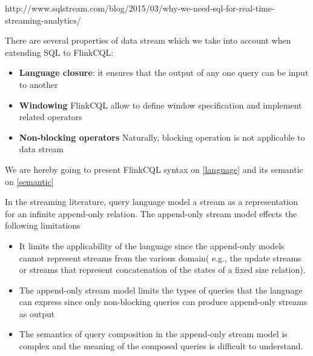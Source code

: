 http://www.sqlstream.com/blog/2015/03/why-we-need-sql-for-real-time-streaming-analytics/

	







There are several properties of data stream which we take into account when extending SQL to FlinkCQL:

\begin{itemize}
	\item \textbf{Language closure}: it ensures that the output of any one query can be input to another
	\item \textbf{Windowing} FlinkCQL allow to define window specification and  implement related operators
	\item \textbf{Non-blocking operators} Naturally, blocking operation is not applicable to data stream
\end{itemize}

We are hereby going to present FlinkCQL syntax on \ref{language} and its semantic  on \ref{semantic}





In the streaming literature, query language model a stream as a representation for an infinite append-only relation. The append-only stream model effects the following limitations\citep{Ghanem:2008}
\begin{itemize}
\item It limits the applicability of the language since the append-only models cannot represent streams from the various domain( e.g., the update streams or streams that represent concatenation of the states of a fixed size relation).
\item The append-only stream model limits the types of queries that the language can express since only non-blocking queries can produce append-only streams as output
\item The semantics of query composition in the append-only stream model is complex and the meaning of the composed queries is difficult to understand.
\end{itemize}

